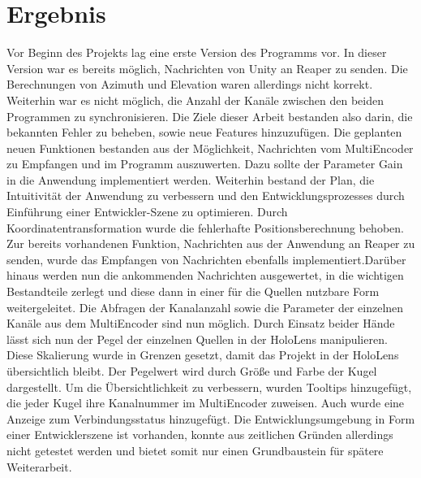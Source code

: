 \documentclass[11pt, titlepage, fleqn]{report}
\begin{document}
        \section{Ergebnis}
        \label{sec:4.1}
        	\sloppy\nohyphens{Vor Beginn des Projekts lag eine erste Version 
        	des Programms vor. 
        	In dieser Version war es bereits möglich, Nachrichten von Unity an 
        	Reaper zu senden. Die Berechnungen von Azimuth und Elevation waren 
        	allerdings nicht korrekt. Weiterhin war es nicht möglich, die 
        	Anzahl der Kanäle zwischen den beiden Programmen zu 
        	synchronisieren.
        	Die Ziele dieser Arbeit bestanden also darin, die bekannten Fehler 
        	zu beheben, sowie neue Features hinzuzufügen. Die geplanten neuen 
        	Funktionen bestanden aus der Möglichkeit, Nachrichten vom 
        	MultiEncoder zu Empfangen und im Programm auszuwerten. Dazu sollte 
        	der Parameter Gain in die Anwendung implementiert werden.\newline 
        	Weiterhin 
        	bestand der Plan, die Intuitivität der Anwendung zu verbessern und 
        	den Entwicklungsprozesses durch Einführung einer Entwickler-Szene 
        	zu optimieren.
        	Durch Koordinatentransformation wurde die fehlerhafte 
        	Positionsberechnung behoben.
        	Zur bereits vorhandenen Funktion, Nachrichten aus der Anwendung an 
        	Reaper zu senden, wurde das Empfangen von Nachrichten ebenfalls 
        	implementiert.\newline Darüber hinaus werden nun die ankommenden 
        	Nachrichten ausgewertet, in die wichtigen Bestandteile zerlegt und 
        	diese dann in einer für die Quellen nutzbare Form 
        	weitergeleitet.
        	Die Abfragen der Kanalanzahl sowie die Parameter der einzelnen 
        	Kanäle aus dem MultiEncoder sind nun möglich.
        	Durch Einsatz beider Hände lässt sich nun der Pegel der einzelnen 
        	Quellen in der HoloLens manipulieren. Diese Skalierung wurde in 
        	Grenzen gesetzt, damit das Projekt in der HoloLens übersichtlich 
        	bleibt. Der Pegelwert wird durch Größe und Farbe der Kugel 
        	dargestellt.\newline
        	Um die Übersichtlichkeit zu verbessern, wurden Tooltips 
        	hinzugefügt, die jeder Kugel ihre Kanalnummer im MultiEncoder 
        	zuweisen. Auch wurde eine Anzeige zum Verbindungsstatus 
        	hinzugefügt.
        	Die Entwicklungsumgebung in Form einer Entwicklerszene ist 
        	vorhanden, konnte aus zeitlichen Gründen allerdings nicht getestet 
        	werden und bietet somit nur einen Grundbaustein für spätere 
        	Weiterarbeit.}\newpage
\end{document}
